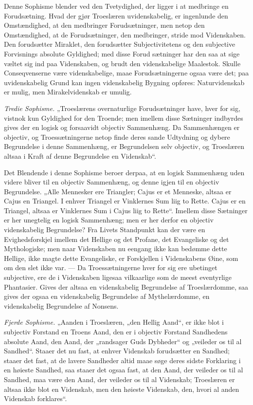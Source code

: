 \documentclass[12pt]{book}
\newcommand{\opage}[1]{\marginnote{\footnotesize\textit{[#1]}}}
\begin{document}
Denne Sophisme blender ved den Tvetydighed, der ligger i at medbringe en Forudsætning. Hvad der gjør Troeslæren uvidenskabelig, er ingenlunde den Omstændighed, at den medbringer Forudsætninger, men netop den Omstændighed, at de Forudsætninger, den medbringer, stride mod Videnskaben. Den forudsætter Miraklet, den forudsætter Subjectivitetens og den subjective Forvisnings absolute Gyldighed; med disse Forud%
\opage{XIV}sætninger har den saa at sige væltet sig ind paa Videnskaben, og brudt den videnskabelige Maalestok. Skulle Conseqvenserne være videnskabelige, maae Forudsætningerne ogsaa være det; paa uvidenskabelig Grund kan ingen videnskabelig Bygning opføres: Naturvidenskab er mulig, men Mirakelvidenskab er umulig.

\emph{Tredie Sophisme.} „Troeslærens overnaturlige Forudsætninger have, hver for sig, vistnok kun Gyldighed for den Troende; men imellem disse Sætninger indbyrdes gives der en logisk og forsaavidt objectiv Sammenhæng. Da Sammenhængen er objectiv, og Troessætningerne netop finde deres sande Udtydning og dybere Begrundelse i denne Sammenhæng, er Begrundelsen selv objectiv, og Troeslæren altsaa i Kraft af denne Begrundelse en Videnskab“.

Det Blendende i denne Sophisme beroer derpaa, at en logisk Sammenhæng uden videre bliver til en objectiv Sammenhæng, og denne igjen til en objectiv Begrundelse. „Alle Mennesker ere Triangler; Cajus er et Menneske, altsaa er Cajus en Triangel. I enhver Triangel er Vinklernes Sum liig to Rette. Cajus er en Triangel, altsaa er Vinklernes Sum i Cajus liig to Rette“. Imellem disse Sætninger er her unegtelig en logisk Sammenhæng; men er her derfor en objectiv videnskabelig Begrundelse? Fra Livets Standpunkt kan der være en Evighedsforskjel imellem det Hellige og det Profane, det Evangeliske og det Mythologiske; men naar Videnskaben nu eengang ikke kan bedømme dette Hellige, ikke magte dette Evangeliske, er Forskjellen i Videnskabens Øine, som om den slet ikke var. --- Da Troessætningerne hver for sig ere ubetinget subjective, ere de i Videnskaben ligesaa vilkaarlige som de meest eventyrlige Phantasier. Gives der altsaa en videnskabelig Begrundelse af Troeslærdomme, saa gives der ogsaa en videnskabelig Begrundelse af Mythelærdomme, en videnskabelig Begrundelse af Nonsens.

\opage{XV}\emph{Fjerde Sophisme.} „Aanden i Troeslæren, „den Hellig Aand“, er ikke blot i subjectiv Forstand en Troens Aand, den er i objectiv Forstand Sandhedens absolute Aand, den Aand, der „randsager Guds Dybheder“ og „veileder os til al Sandhed“. Staaer det nu fast, at enhver Videnskab forudsætter en Sandhed; staaer det fast, at de lavere Sandheder altid maae søge deres sidste Forklaring i en høieste Sandhed, saa staaer det ogsaa fast, at den Aand, der veileder os til al Sandhed, maa være den Aand, der veileder os til al Videnskab; Troeslæren er altsaa ikke blot en Videnskab, men den høieste Videnskab, den, hvori al anden Videnskab forklares“.
\end{document}
